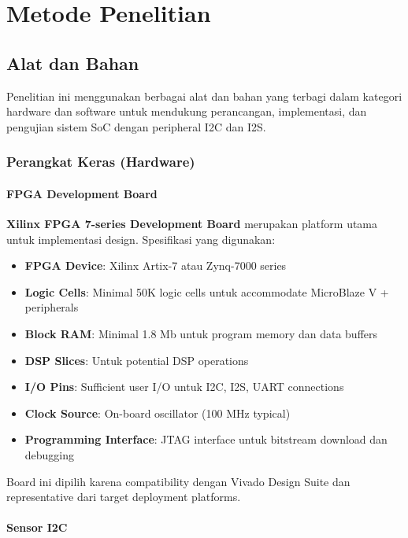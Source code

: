 \chapter{Metode Penelitian}

\section{Alat dan Bahan}

Penelitian ini menggunakan berbagai alat dan bahan yang terbagi dalam kategori hardware dan software untuk mendukung perancangan, implementasi, dan pengujian sistem SoC dengan peripheral I2C dan I2S.

\subsection{Perangkat Keras (Hardware)}

\subsubsection{FPGA Development Board}

\textbf{Xilinx FPGA 7-series Development Board} merupakan platform utama untuk implementasi design. Spesifikasi yang digunakan:
\begin{itemize}
	\item \textbf{FPGA Device}: Xilinx Artix-7 atau Zynq-7000 series
	\item \textbf{Logic Cells}: Minimal 50K logic cells untuk accommodate MicroBlaze V + peripherals
	\item \textbf{Block RAM}: Minimal 1.8 Mb untuk program memory dan data buffers
	\item \textbf{DSP Slices}: Untuk potential DSP operations
	\item \textbf{I/O Pins}: Sufficient user I/O untuk I2C, I2S, UART connections
	\item \textbf{Clock Source}: On-board oscillator (100 MHz typical)
	\item \textbf{Programming Interface}: JTAG interface untuk bitstream download dan debugging
\end{itemize}

Board ini dipilih karena compatibility dengan Vivado Design Suite dan representative dari target deployment platforms.

\subsubsection{Sensor I2C}

